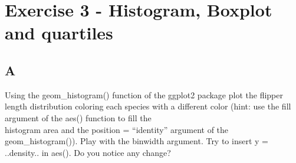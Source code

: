 \documentclass[
]{article}
\newenvironment{Shaded}{\begin{snugshade}}{\end{snugshade}}
\newcommand{\DataTypeTok}[1]{\textcolor[rgb]{0.13,0.29,0.53}{#1}}
\newcommand{\DecValTok}[1]{\textcolor[rgb]{0.00,0.00,0.81}{#1}}
\newcommand{\KeywordTok}[1]{\textcolor[rgb]{0.13,0.29,0.53}{\textbf{#1}}}
\newcommand{\NormalTok}[1]{#1}
\newcommand{\OperatorTok}[1]{\textcolor[rgb]{0.81,0.36,0.00}{\textbf{#1}}}
\newcommand{\StringTok}[1]{\textcolor[rgb]{0.31,0.60,0.02}{#1}}
\begin{document}
\hypertarget{exercise-3---histogram-boxplot-and-quartiles}{%
\section{Exercise 3 - Histogram, Boxplot and
quartiles}\label{exercise-3---histogram-boxplot-and-quartiles}}

\hypertarget{a-2}{%
\subsection{A}\label{a-2}}

Using the geom\_histogram() function of the ggplot2 package plot the
flipper length distribution coloring each species with a different color
(hint: use the fill argument of the aes() function to fill the\\
histogram area and the position = ``identity'' argument of the
geom\_histogram()). Play with the binwidth argument. Try to insert y =
..density.. in aes(). Do you notice any change?

\begin{Shaded}
\end{Shaded}
\end{document}
